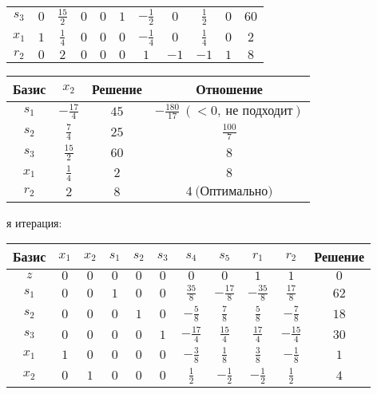 \documentclass{article}%
\begin{document}
\begin{flushleft}
\begin{tabular}{|c|ccccccccc|c|}
$s_{3}$&$0$&$\frac{15}{2}$&$0$&$0$&$1$&$-\frac{1}{2}$&$0$&$\frac{1}{2}$&$0$&$60$\\%
$x_{1}$&$1$&$\frac{1}{4}$&$0$&$0$&$0$&$-\frac{1}{4}$&$0$&$\frac{1}{4}$&$0$&$2$\\%
$r_{2}$&$0$&$2$&$0$&$0$&$0$&$1$&$-1$&$-1$&$1$&$8$\\%
\hline%
\end{tabular}%
\newline%
\newline%
\newline%
\begin{tabular}{|cccc|}%
\hline%
Базис&$x_{2}$&Решение&Отношение\\%
\hline%
$s_{1}$&$-\frac{17}{4}$&$45$&$-\frac{180}{17}\: (< 0, \: \text{не подходит})$\\%
$s_{2}$&$\frac{7}{4}$&$25$&$\frac{100}{7}$\\%
$s_{3}$&$\frac{15}{2}$&$60$&$8$\\%
$x_{1}$&$\frac{1}{4}$&$2$&$8$\\%
$r_{2}$&$2$&$8$&$4\: \text{(Оптимально)}$\\%
\hline%
\end{tabular}%
\newline%
\newline%
я итерация: %
\newline%
\newline%
\renewcommand{\arraystretch}{1.3}%
\begin{tabular}{|c|ccccccccc|c|}%
\hline%
Базис&$x_{1}$&$x_{2}$&$s_{1}$&$s_{2}$&$s_{3}$&$s_{4}$&$s_{5}$&$r_{1}$&$r_{2}$&Решение\\%
\hline%
$z$&$0$&$0$&$0$&$0$&$0$&$0$&$0$&$1$&$1$&$0$\\%
\hline%
$s_{1}$&$0$&$0$&$1$&$0$&$0$&$\frac{35}{8}$&$-\frac{17}{8}$&$-\frac{35}{8}$&$\frac{17}{8}$&$62$\\%
$s_{2}$&$0$&$0$&$0$&$1$&$0$&$-\frac{5}{8}$&$\frac{7}{8}$&$\frac{5}{8}$&$-\frac{7}{8}$&$18$\\%
$s_{3}$&$0$&$0$&$0$&$0$&$1$&$-\frac{17}{4}$&$\frac{15}{4}$&$\frac{17}{4}$&$-\frac{15}{4}$&$30$\\%
$x_{1}$&$1$&$0$&$0$&$0$&$0$&$-\frac{3}{8}$&$\frac{1}{8}$&$\frac{3}{8}$&$-\frac{1}{8}$&$1$\\%
$x_{2}$&$0$&$1$&$0$&$0$&$0$&$\frac{1}{2}$&$-\frac{1}{2}$&$-\frac{1}{2}$&$\frac{1}{2}$&$4$\\%
\hline%
\end{tabular}%
\newline%

\end{flushleft}
\end{document}
